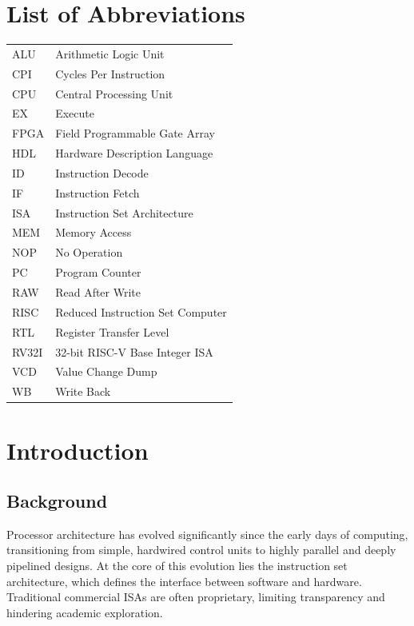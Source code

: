 \documentclass[12pt,a4paper]{report}
\begin{document}
\chapter*{List of Abbreviations}

\begin{tabular}{ll}
ALU   & Arithmetic Logic Unit \\
CPI   & Cycles Per Instruction \\
CPU   & Central Processing Unit \\
EX    & Execute \\
FPGA  & Field Programmable Gate Array \\
HDL   & Hardware Description Language \\
ID    & Instruction Decode \\
IF    & Instruction Fetch \\
ISA   & Instruction Set Architecture \\
MEM   & Memory Access \\
NOP   & No Operation \\
PC    & Program Counter \\
RAW   & Read After Write \\
RISC  & Reduced Instruction Set Computer \\
RTL   & Register Transfer Level \\
RV32I & 32-bit RISC-V Base Integer ISA \\
VCD   & Value Change Dump \\
WB    & Write Back \\
\end{tabular}

\clearpage
{}
\setcounter{page}{1}

\chapter{Introduction}

\section{Background}
Processor architecture has evolved significantly since the early days of computing,
transitioning from simple, hardwired control units to highly parallel and deeply
pipelined designs. At the core of this evolution lies the instruction set architecture,
which defines the interface between software and hardware. Traditional commercial ISAs
are often proprietary, limiting transparency and hindering academic exploration.
\end{document}
